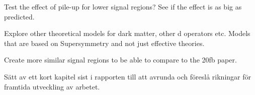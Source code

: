 Test the effect of pile-up for lower signal regions? See if the effect is as big as predicted. 

Explore other theoretical models for dark matter, other d operators etc. Models that are based on Supersymmetry and not just effective theories.

Create more similar signal regions to be able to compare to the 20fb paper. 


Sätt av ett kort kapitel sist i rapporten till att avrunda och föreslå rikningar för framtida utveckling av arbetet.
